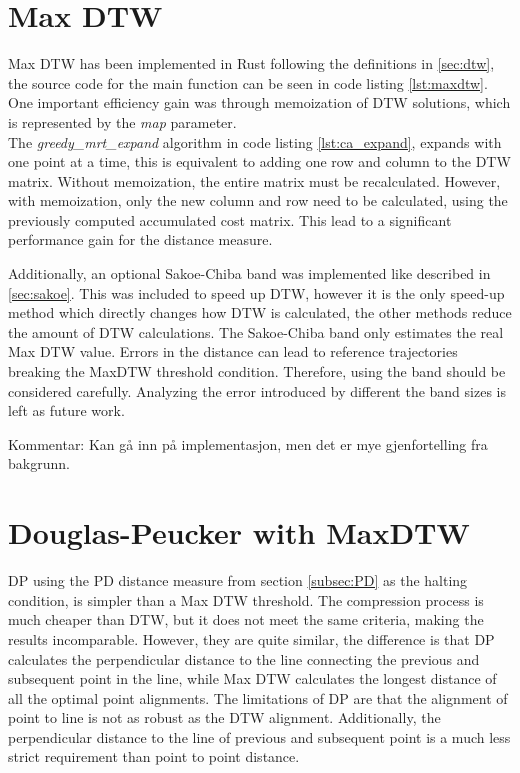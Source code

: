 \section{Max DTW}
\label{sec:dtw_impl}
Max DTW has been implemented in Rust following the definitions in \ref{sec:dtw}, the source code for the main function can be seen in code listing \ref{lst:maxdtw}. One important efficiency gain was through memoization of DTW solutions, which is represented by the \textit{map} parameter. \\ The \textit{greedy\_mrt\_expand} algorithm in code listing \ref{lst:ca_expand}, expands with one point at a time, this is equivalent to adding one row and column to the DTW matrix. Without memoization, the entire matrix must be recalculated. However, with memoization, only the new column and row need to be calculated, using the previously computed accumulated cost matrix. This lead to a significant performance gain for the distance measure.

Additionally, an optional Sakoe-Chiba band was implemented like described in \ref{sec:sakoe}. This was included to speed up DTW, however it is the only speed-up method which directly changes how DTW is calculated, the other methods reduce the amount of DTW calculations. The Sakoe-Chiba band only estimates the real Max DTW value. Errors in the distance can lead to reference trajectories breaking the MaxDTW threshold condition. Therefore, using the band should be considered carefully. Analyzing the error introduced by different the band sizes is left as future work.



Kommentar: Kan gå inn på implementasjon, men det er mye gjenfortelling fra bakgrunn.

\section{Douglas-Peucker with MaxDTW}
DP using the PD distance measure from section \ref{subsec:PD} as the halting condition, is simpler than a Max DTW threshold. The compression process is much cheaper than DTW, but it does not meet the same criteria, making the results incomparable. However, they are quite similar, the difference is that DP calculates the perpendicular distance to the line connecting the previous and subsequent point in the line, while Max DTW calculates the longest distance of all the optimal point alignments. The limitations of DP are that the alignment of point to line is not as robust as the DTW alignment. Additionally, the perpendicular distance to the line of previous and subsequent point is a much less strict requirement than point to point distance.

